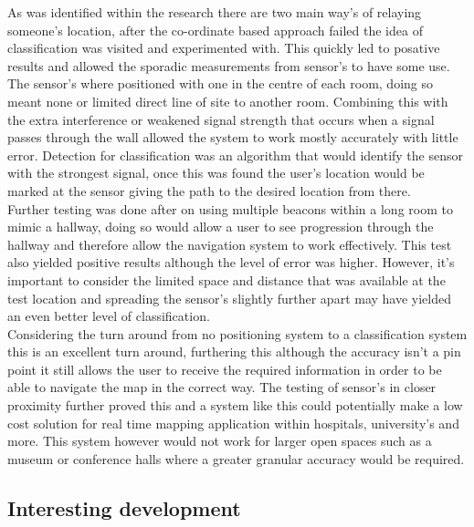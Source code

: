 As was identified within the research there are two main way's of relaying someone's location, after the co-ordinate based approach failed the idea of classification was visited and experimented with. This quickly led to posative results and allowed the sporadic measurements from sensor's to have some use. The sensor's where positioned with one in the centre of each room, doing so meant none or limited direct line of site to another room. Combining this with the extra interference or weakened signal strength that occurs when a signal passes through the wall allowed the system to work mostly accurately with little error. Detection for classification was an algorithm that would identify the sensor with the strongest signal, once this was found the user's location would be marked at the sensor giving the path to the desired location from there.\\

Further testing was done after on using multiple beacons within a long room to mimic a hallway, doing so would allow a user to see progression through the hallway and therefore allow the navigation system to work effectively. This test also yielded positive results although the level of error was higher. However, it's important to consider the limited space and distance that was available at the test location and spreading the sensor's slightly further apart may have yielded an even better level of classification.\\

Considering the turn around from no positioning system to a classification system this is an excellent turn around, furthering this although the accuracy isn't a pin point it still allows the user to receive the required information in order to be able to navigate the map in the correct way. The testing of sensor's in closer proximity further proved this and a system like this could potentially make a low cost solution for real time mapping application within hospitals, university's and more. This system however would not work for larger open spaces such as a museum or conference halls where a greater granular accuracy would be required.

\subsection{Interesting development}
